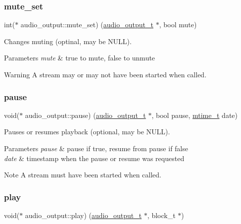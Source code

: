 \subsubsection{\texorpdfstring{mute\+\_\+set}{mute\_set}}
{\footnotesize\ttfamily int($\ast$ audio\+\_\+output\+::mute\+\_\+set) (\hyperlink{structaudio__output}{audio\+\_\+output\+\_\+t} $\ast$, bool mute)}

Changes muting (optinal, may be N\+U\+LL). 
\begin{DoxyParams}{Parameters}
{\em mute} & true to mute, false to unmute \\
\hline
\end{DoxyParams}
\begin{DoxyWarning}{Warning}
A stream may or may not have been started when called. 
\end{DoxyWarning}
\mbox{\label{structaudio__output_aa43086ee0feb50b08ebff9b6f4ccb643}} 
\subsubsection{\texorpdfstring{pause}{pause}}
{\footnotesize\ttfamily void($\ast$ audio\+\_\+output\+::pause) (\hyperlink{structaudio__output}{audio\+\_\+output\+\_\+t} $\ast$, bool pause, \hyperlink{vlc__common_8h_a996e47c5ea061215703c26738351279e}{mtime\+\_\+t} date)}

Pauses or resumes playback (optional, may be N\+U\+LL). 
\begin{DoxyParams}{Parameters}
{\em pause} & pause if true, resume from pause if false \\
\hline
{\em date} & timestamp when the pause or resume was requested \\
\hline
\end{DoxyParams}
\begin{DoxyNote}{Note}
A stream must have been started when called. 
\end{DoxyNote}
\mbox{\label{structaudio__output_aed30544225e26db43e161ac68782fb48}} 
\subsubsection{\texorpdfstring{play}{play}}
{\footnotesize\ttfamily void($\ast$ audio\+\_\+output\+::play) (\hyperlink{structaudio__output}{audio\+\_\+output\+\_\+t} $\ast$, block\+\_\+t $\ast$)}

